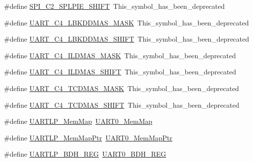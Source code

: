 \begin{DoxyCompactItemize}
\item 
\#define \hyperlink{group___backward___compatibility___symbols_ga6b417fe91e6264b06ed45234e4bdb987}{S\+P\+I\+\_\+\+C2\+\_\+\+S\+P\+L\+P\+I\+E\+\_\+\+S\+H\+I\+FT}~This\+\_\+symbol\+\_\+has\+\_\+been\+\_\+deprecated
\item 
\#define \hyperlink{group___backward___compatibility___symbols_ga4fbe0c821c729ee10ec2a5398d68e13f}{U\+A\+R\+T\+\_\+\+C4\+\_\+\+L\+B\+K\+D\+D\+M\+A\+S\+\_\+\+M\+A\+SK}~This\+\_\+symbol\+\_\+has\+\_\+been\+\_\+deprecated
\item 
\#define \hyperlink{group___backward___compatibility___symbols_gaa3e4b00c90d731ac214ec241c5739824}{U\+A\+R\+T\+\_\+\+C4\+\_\+\+L\+B\+K\+D\+D\+M\+A\+S\+\_\+\+S\+H\+I\+FT}~This\+\_\+symbol\+\_\+has\+\_\+been\+\_\+deprecated
\item 
\#define \hyperlink{group___backward___compatibility___symbols_ga12f2c283d457dabb4c399413da95290d}{U\+A\+R\+T\+\_\+\+C4\+\_\+\+I\+L\+D\+M\+A\+S\+\_\+\+M\+A\+SK}~This\+\_\+symbol\+\_\+has\+\_\+been\+\_\+deprecated
\item 
\#define \hyperlink{group___backward___compatibility___symbols_ga696b99c80acb65a95530c792e61158a5}{U\+A\+R\+T\+\_\+\+C4\+\_\+\+I\+L\+D\+M\+A\+S\+\_\+\+S\+H\+I\+FT}~This\+\_\+symbol\+\_\+has\+\_\+been\+\_\+deprecated
\item 
\#define \hyperlink{group___backward___compatibility___symbols_ga9a5b6a456c330e9d6b15e612c6e5725a}{U\+A\+R\+T\+\_\+\+C4\+\_\+\+T\+C\+D\+M\+A\+S\+\_\+\+M\+A\+SK}~This\+\_\+symbol\+\_\+has\+\_\+been\+\_\+deprecated
\item 
\#define \hyperlink{group___backward___compatibility___symbols_gad7b56c2826bb55b9112c190448d01176}{U\+A\+R\+T\+\_\+\+C4\+\_\+\+T\+C\+D\+M\+A\+S\+\_\+\+S\+H\+I\+FT}~This\+\_\+symbol\+\_\+has\+\_\+been\+\_\+deprecated
\item 
\#define \hyperlink{group___backward___compatibility___symbols_ga92b653c99e40007d3c3339a79fa0e6a5}{U\+A\+R\+T\+L\+P\+\_\+\+Mem\+Map}~\hyperlink{struct_u_a_r_t0___mem_map}{U\+A\+R\+T0\+\_\+\+Mem\+Map}
\item 
\#define \hyperlink{group___backward___compatibility___symbols_ga589ef759d83410b6f02bd68fcc3bf090}{U\+A\+R\+T\+L\+P\+\_\+\+Mem\+Map\+Ptr}~\hyperlink{group___u_a_r_t0___peripheral_gae795171499e041fb9b8f6ad5b97f896b}{U\+A\+R\+T0\+\_\+\+Mem\+Map\+Ptr}
\item 
\#define \hyperlink{group___backward___compatibility___symbols_ga30ce68ea180cb316cc6ba162f5070dd0}{U\+A\+R\+T\+L\+P\+\_\+\+B\+D\+H\+\_\+\+R\+EG}~\hyperlink{group___u_a_r_t0___register___accessor___macros_ga92a738cb5fe10aaf02d85fb5c5b6a936}{U\+A\+R\+T0\+\_\+\+B\+D\+H\+\_\+\+R\+EG}

\end{DoxyCompactItemize}
